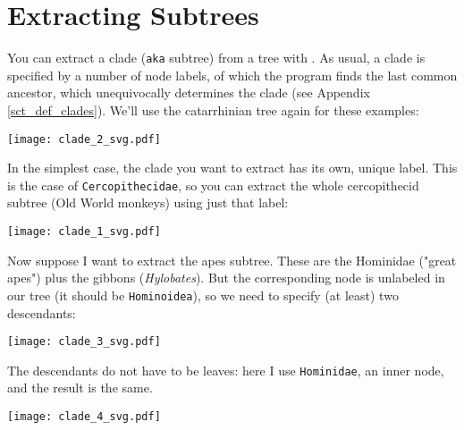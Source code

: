 

\section{Extracting Subtrees}
\label{sct_subtrees}

You can extract a clade (\texttt{aka} subtree) from a tree with \clade. As
usual, a clade is specified by a number of node labels, of which the program
finds the last common ancestor, which unequivocally determines the clade (see
Appendix \ref{sct_def_clades}).  We'll use the catarrhinian tree again for
these examples:


\begin{center}
\texttt{[image: clade\_2\_svg.pdf]}
\end{center}

In the simplest case, the clade you want to extract has its own, unique label.
This is the case of \texttt{Cercopithecidae}, so you can extract the whole
cercopithecid subtree (Old World monkeys) using just that label:


\begin{center}
  \texttt{[image: clade\_1\_svg.pdf]}
\end{center}

Now suppose I want to extract the apes subtree. These are the Hominidae
("great apes") plus the gibbons (\textit{Hylobates}). But the corresponding
node is unlabeled in our tree (it should be \texttt{Hominoidea}), so we need to specify (at least) two descendants:


\begin{center}
  \texttt{[image: clade\_3\_svg.pdf]}
\end{center}

\noindent{}The descendants do not have to be leaves: here I use \texttt{Hominidae}, an inner node, and the result is the same.


\begin{center}
  \texttt{[image: clade\_4\_svg.pdf]}
\end{center}


